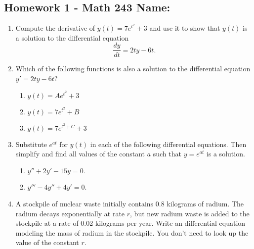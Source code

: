 \documentclass[10pt]{article}
\begin{document}
\pagestyle{empty}
\subsection*{Homework 1 - Math 243 \hfill Name: \underline{\hspace*{2in}}}

\noindent

\begin{enumerate}
\item Compute the derivative of $y(t) = 7e^{t^2} + 3$ and use it to show that $y(t)$ is a solution to the differential equation 
$$\dfrac{dy}{dt} = 2 t y - 6t.$$
\vfill

\item Which of the following functions is also a solution to the differential equation $y' = 2ty - 6t$?   
\begin{enumerate}
\item $y(t) = Ae^{t^2} + 3$
\item $y(t) = 7e^{t^2} + B$
\item $y(t) = 7e^{t^2+C} + 3$
\end{enumerate}
\vfill

\item Substitute $e^{at}$ for $y(t)$ in each of the following differential equations.  Then simplify and find all values of the constant $a$ such that $y = e^{at}$ is a solution. 
\begin{enumerate}
\item $y'' + 2y' - 15y = 0$.
\vfill
\item $y''' - 4 y'' + 4 y' = 0$.
\vfill
\end{enumerate}


\item A stockpile of nuclear waste initially contains 0.8 kilograms of radium. The radium decays exponentially at rate $r$, but new radium waste is added to the stockpile at a rate of 0.02 kilograms per year. Write an differential equation modeling the mass of radium in the stockpile. You don't need to look up the value of the constant $r$. 
\vfill



\newpage
\setcounter{enumCount}{\theenumi}
\end{enumerate}
\end{document}
